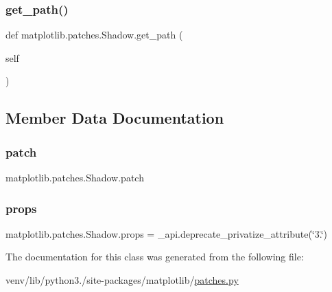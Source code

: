 \subsubsection{\texorpdfstring{get\+\_\+path()}{get\_path()}}
{\footnotesize\ttfamily def matplotlib.\+patches.\+Shadow.\+get\+\_\+path (\begin{DoxyParamCaption}\item[{}]{self }\end{DoxyParamCaption})}



\subsection{Member Data Documentation}
\mbox{\label{classmatplotlib_1_1patches_1_1Shadow_a0402714658fa204e27f74a6b1382a73a}} 
\subsubsection{\texorpdfstring{patch}{patch}}
{\footnotesize\ttfamily matplotlib.\+patches.\+Shadow.\+patch}

\mbox{\label{classmatplotlib_1_1patches_1_1Shadow_a1b05ddbf77330ce533e6bb14ffb25e49}} 
\subsubsection{\texorpdfstring{props}{props}}
{\footnotesize\ttfamily matplotlib.\+patches.\+Shadow.\+props = \+\_\+api.\+deprecate\+\_\+privatize\+\_\+attribute(\char`\"{}3.\char`\"{})\hspace{0.3cm}{\ttfamily [static]}}



The documentation for this class was generated from the following file\+:\begin{DoxyCompactItemize}
\item 
venv/lib/python3./site-\/packages/matplotlib/\hyperlink{patches_8py}{patches.\+py}\end{DoxyCompactItemize}
